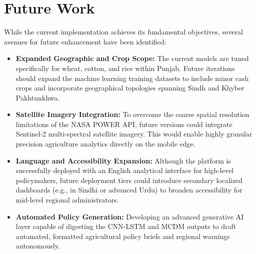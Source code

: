 \section{Future Work}
While the current implementation achieves its fundamental objectives, several avenues for future enhancement have been identified:
\begin{itemize}
    \item \textbf{Expanded Geographic and Crop Scope:} The current models are tuned specifically for wheat, cotton, and rice within Punjab. Future iterations should expand the machine learning training datasets to include minor cash crops and incorporate geographical topologies spanning Sindh and Khyber Pakhtunkhwa.
    \item \textbf{Satellite Imagery Integration:} To overcome the coarse spatial resolution limitations of the NASA POWER API, future versions could integrate Sentinel-2 multi-spectral satellite imagery. This would enable highly granular precision agriculture analytics directly on the mobile edge.
    \item \textbf{Language and Accessibility Expansion:} Although the platform is successfully deployed with an English analytical interface for high-level policymakers, future deployment tiers could introduce secondary localized dashboards (e.g., in Sindhi or advanced Urdu) to broaden accessibility for mid-level regional administrators.
    \item \textbf{Automated Policy Generation:} Developing an advanced generative AI layer capable of digesting the CNN-LSTM and MCDM outputs to draft automated, formatted agricultural policy briefs and regional warnings autonomously.
\end{itemize}

